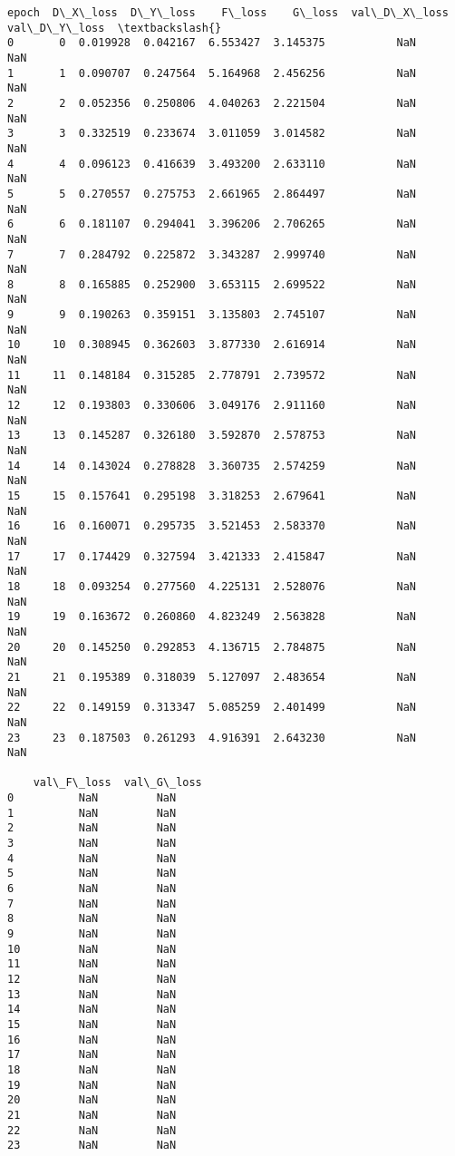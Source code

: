 \documentclass[11pt]{article}
\begin{document}
    \begin{Verbatim}[commandchars=\\\{\}]
    epoch  D\_X\_loss  D\_Y\_loss    F\_loss    G\_loss  val\_D\_X\_loss  val\_D\_Y\_loss  \textbackslash{}
0       0  0.019928  0.042167  6.553427  3.145375           NaN           NaN
1       1  0.090707  0.247564  5.164968  2.456256           NaN           NaN
2       2  0.052356  0.250806  4.040263  2.221504           NaN           NaN
3       3  0.332519  0.233674  3.011059  3.014582           NaN           NaN
4       4  0.096123  0.416639  3.493200  2.633110           NaN           NaN
5       5  0.270557  0.275753  2.661965  2.864497           NaN           NaN
6       6  0.181107  0.294041  3.396206  2.706265           NaN           NaN
7       7  0.284792  0.225872  3.343287  2.999740           NaN           NaN
8       8  0.165885  0.252900  3.653115  2.699522           NaN           NaN
9       9  0.190263  0.359151  3.135803  2.745107           NaN           NaN
10     10  0.308945  0.362603  3.877330  2.616914           NaN           NaN
11     11  0.148184  0.315285  2.778791  2.739572           NaN           NaN
12     12  0.193803  0.330606  3.049176  2.911160           NaN           NaN
13     13  0.145287  0.326180  3.592870  2.578753           NaN           NaN
14     14  0.143024  0.278828  3.360735  2.574259           NaN           NaN
15     15  0.157641  0.295198  3.318253  2.679641           NaN           NaN
16     16  0.160071  0.295735  3.521453  2.583370           NaN           NaN
17     17  0.174429  0.327594  3.421333  2.415847           NaN           NaN
18     18  0.093254  0.277560  4.225131  2.528076           NaN           NaN
19     19  0.163672  0.260860  4.823249  2.563828           NaN           NaN
20     20  0.145250  0.292853  4.136715  2.784875           NaN           NaN
21     21  0.195389  0.318039  5.127097  2.483654           NaN           NaN
22     22  0.149159  0.313347  5.085259  2.401499           NaN           NaN
23     23  0.187503  0.261293  4.916391  2.643230           NaN           NaN

    val\_F\_loss  val\_G\_loss
0          NaN         NaN
1          NaN         NaN
2          NaN         NaN
3          NaN         NaN
4          NaN         NaN
5          NaN         NaN
6          NaN         NaN
7          NaN         NaN
8          NaN         NaN
9          NaN         NaN
10         NaN         NaN
11         NaN         NaN
12         NaN         NaN
13         NaN         NaN
14         NaN         NaN
15         NaN         NaN
16         NaN         NaN
17         NaN         NaN
18         NaN         NaN
19         NaN         NaN
20         NaN         NaN
21         NaN         NaN
22         NaN         NaN
23         NaN         NaN
    \end{Verbatim}
\end{document}

